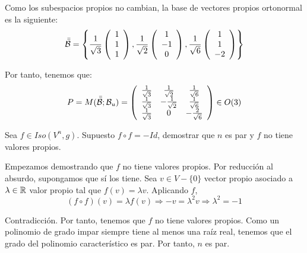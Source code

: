 \begin{ejercicio}
\begin{enumerate}
        Como los subespacios propios no cambian, la base de vectores propios ortonormal es la siguiente:
        \begin{equation*}
            \bar{\bar{\mathcal{B}}}=\left\{
                \frac{1}{\sqrt{3}}\left(\begin{array}{c}
                     1 \\ 1 \\ 1
                \end{array}\right),
                \frac{1}{\sqrt{2}}\left(\begin{array}{c}
                     1 \\ -1 \\ 0
                \end{array} \right),
                \frac{1}{\sqrt{6}}\left(\begin{array}{c}
                     1 \\ 1 \\ -2
                \end{array} \right)\right\}
        \end{equation*}

        Por tanto, tenemos que:
        \begin{equation*}
            P=M(\bar{\bar{\mathcal{B}}};\mathcal{B}_u)=\left(\begin{array}{ccc}
                \frac{1}{\sqrt{3}} & \frac{1}{\sqrt{2}} & \frac{1}{\sqrt{6}}\\
                \frac{1}{\sqrt{3}} & -\frac{1}{\sqrt{2}} &\frac{1}{\sqrt{6}}\\
                \frac{1}{\sqrt{3}} & 0& -\frac{2}{\sqrt{6}}\\
            \end{array}\right) \in O(3)
        \end{equation*}
    \end{enumerate}
\end{ejercicio}

\begin{ejercicio}
    Sea $f\in Iso(V^n, g)$. Supuesto $f\circ f=-Id$, demostrar que $n$ es par y $f$ no tiene valores propios.


    Empezamos demostrando que $f$ no tiene valores propios. Por reducción al absurdo, supongamos que sí los tiene. Sea $v\in V-\{0\}$ vector propio asociado a $\lambda \in \mathbb{R}$ valor propio tal que $f(v)=\lambda v$. Aplicando $f$,
    \begin{equation*}
        (f\circ f)(v) = \lambda f(v) \Longrightarrow -v = \lambda ^2 v \Longrightarrow \lambda ^2 = -1
    \end{equation*}

    Contradicción. Por tanto, tenemos que $f$ no tiene valores propios. Como un polinomio de grado impar siempre tiene al menos una raíz real, tenemos que el grado del polinomio característico es par. Por tanto, $n$ es par.
\end{ejercicio}

